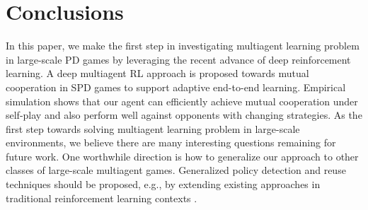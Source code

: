 \documentclass{article}
\begin{document}
\section{Conclusions}
\begin{comment}
In this paper, we make the first step in investigating multiagent learning problem in large-scale PD games by leveraging the recent advance of deep reinforcement learning.
A deep multiagent reinforcement learning approach is proposed towards
mutual cooperation in SPD games to support adaptive end-to-end learning. There are three points to our main contribution.  First, we propose training policies with different cooperation degrees and combining with policy generation strategy to generate policies. Second, we propose a cooperation degree detection network which implements an LSTM-based structure with an encoder-decoder module and generate a training dataset. Last, we extend the Tit-for-Tat principle into SPD scenarios using cooperation degree detection network and policy generation. Our approach is cooperation-oriented and seeks for mutual cooperation whenever possible, while it also avoids being exploited when faced with selfish opponents. Empirical simulation shows that our agent can efficiently achieve mutual cooperation under self-play and also perform well against opponents with changing strategies.
As the first step towards solving multiagent learning problem in large-scale environments, we believe there are a lot of works remaining as future work. One worthwhile direction is how to generalize our approach to other classes of large-scale multiagent games. Generalized policy detection and reuse techniques should be proposed, e.g., by extending existing approaches in traditional reinforcement learning contexts \cite{Hernandez2016Identifying,hernandez2016bayesian,Hernandez2017Towards}.
\end{comment}

In this paper, we make the first step in investigating multiagent learning problem in large-scale PD games by leveraging the recent advance of deep reinforcement learning.
A deep multiagent RL approach is proposed towards mutual cooperation in SPD games to support adaptive end-to-end learning.
Empirical simulation shows that our agent can efficiently achieve mutual cooperation under self-play and also perform well against opponents with changing strategies.
As the first step towards solving multiagent learning problem in large-scale environments, we believe there are many interesting questions remaining for future work. One worthwhile direction is how to generalize our approach to other classes of large-scale multiagent games. Generalized policy detection and reuse techniques should be proposed, e.g., by extending existing approaches in traditional reinforcement learning contexts \cite{Hernandez2016Identifying,hernandez2016bayesian,Hernandez2017Towards}.
\end{document}
